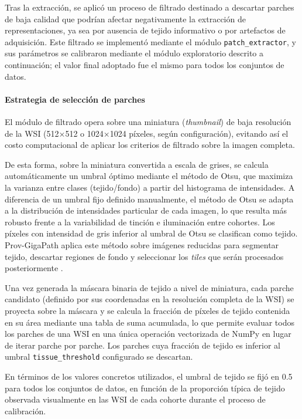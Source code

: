 Tras la extracción, se aplicó un proceso de filtrado destinado a descartar parches de baja calidad que podrían afectar negativamente la extracción de representaciones, ya sea por ausencia de tejido informativo o por artefactos de adquisición. Este filtrado se implementó mediante el módulo \texttt{patch\_extractor}, y sus parámetros se calibraron mediante el módulo exploratorio descrito a continuación; el valor final adoptado fue el mismo para todos los conjuntos de datos.

\paragraph{Estrategia de selección de parches} El módulo de filtrado opera sobre una miniatura (\textit{thumbnail}) de baja resolución de la WSI (512×512 o 1024×1024 píxeles, según configuración), evitando así el costo computacional de aplicar los criterios de filtrado sobre la imagen completa.


De esta forma, sobre la miniatura convertida a escala de grises, se calcula automáticamente un umbral óptimo mediante el método de Otsu, que maximiza la varianza entre clases (tejido/fondo) a partir del histograma de intensidades. A diferencia de un umbral fijo definido manualmente, el método de Otsu se adapta a la distribución de intensidades particular de cada imagen, lo que resulta más robusto frente a la variabilidad de tinción e iluminación entre cohortes. Los píxeles con intensidad de gris inferior al umbral de Otsu se clasifican como tejido. Prov-GigaPath aplica este método sobre imágenes reducidas para segmentar tejido, descartar regiones de fondo y seleccionar los \textit{tiles} que serán procesados posteriormente \parencite{xu2024provgigapath}.

Una vez generada la máscara binaria de tejido a nivel de miniatura, cada parche candidato (definido por sus coordenadas en la resolución completa de la WSI) se proyecta sobre la máscara y se calcula la fracción de píxeles de tejido contenida en su área mediante una tabla de suma acumulada, lo que permite evaluar todos los parches de una WSI en una única operación vectorizada de NumPy en lugar de iterar parche por parche. Los parches cuya fracción de tejido es inferior al umbral \texttt{tissue\_threshold} configurado se descartan.

En términos de los valores concretos utilizados, el umbral de tejido se fijó en 0.5 para todos los conjuntos de datos, en función de la proporción típica de tejido observada visualmente en las WSI de cada cohorte durante el proceso de calibración.

